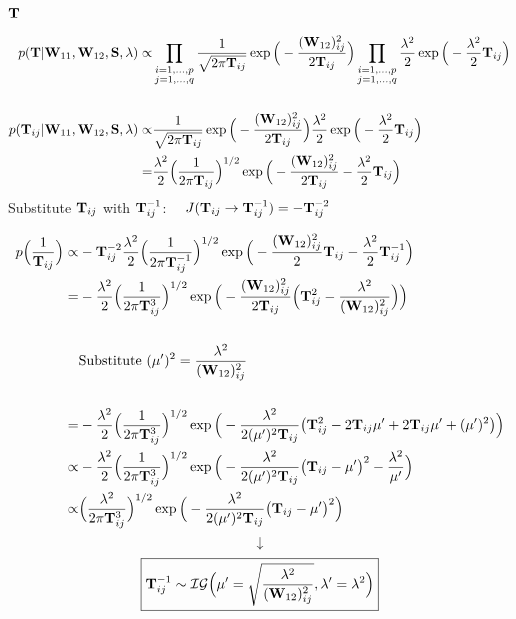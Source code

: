 \subsubsection{$\mathbf{T}$}
\begin{align*}
p(\mathbf{T}| \mathbf{W}_{11}, \mathbf{W}_{12}, \mathbf{S}, \lambda) \propto& 
\prod_{{\substack{i=1,\dots,p\\j=1,\dots,q}} }   \frac{1}{\sqrt{2\pi \mathbf{T}_{ij}}} \exp 
\Big( - \frac{(\mathbf{W}_{12})_{ij}^2}{2\mathbf{T}_{ij}} \Big) 
\prod_{{\substack{i=1,\dots,p\\j=1,\dots,q}} }   
\frac{\lambda^2}{2} 
\exp\Big( 
- \frac{\lambda^2}{2} \mathbf{T}_{ij} 
\Big)
\\
\\
p(\mathbf{T}_{ij}| \mathbf{W}_{11}, \mathbf{W}_{12}, \mathbf{S}, \lambda) \propto& 
\frac{1}{\sqrt{2\pi \mathbf{T}_{ij}}} \exp 
\Big( - \frac{(\mathbf{W}_{12})_{ij}^2}{2\mathbf{T}_{ij}} \Big)    
\frac{\lambda^2}{2} 
\exp\Big( 
- \frac{\lambda^2}{2} \mathbf{T}_{ij} 
\Big)
\\
=& \frac{\lambda^2}{2} \Big(\frac{1}{2\pi \mathbf{T}_{ij}}\Big)^{1/2} \exp \Big(-\frac{(\mathbf{W}_{12})_{ij}^2}{2\mathbf{T}_{ij}} - \frac{\lambda^2}{2} \mathbf{T}_{ij}\Big)
\end{align*}
Substitute $\mathbf{T}_{ij}$ with $\mathbf{T}_{ij}^{-1}$:
$
\quad
J(\mathbf{T}_{ij} \rightarrow \mathbf{T}_{ij}^{-1}) = -\mathbf{T}_{ij}^{-2}
$

\begin{align*}
p\Big(\frac{1}{\mathbf{T}_{ij}}\Big) \propto&
 -\mathbf{T}_{ij}^{-2} \frac{\lambda^2}{2}
\Big(
	\frac{1}{2\pi\mathbf{T}_{ij}^{-1}}
\Big)^{1/2} 
\exp \Big(
	- \frac{(\mathbf{W}_{12})_{ij}^2}{2}\mathbf{T}_{ij} - \frac{\lambda^2}{2}\mathbf{T}_{ij}^{-1}
\Big)
\\
=&
- \frac{\lambda^2}{2}
\Big(
	\frac{1}{2\pi\mathbf{T}_{ij}^{3}}
\Big)^{1/2} 
\exp \Big(
	- \frac{(\mathbf{W}_{12})_{ij}^2}{2\mathbf{T}_{ij}}
	\Big(
	\mathbf{T}_{ij}^2 - \frac{\lambda^2}{(\mathbf{W}_{12})_{ij}^{2}}
	\Big)
\Big)
\\
\\
&\text{Substitute }(\mu')^2 = \frac{\lambda^2}{(\mathbf{W}_{12})_{ij}^2}
\\
\\
=& 
- \frac{\lambda^2}{2}
\Big(
\frac{1}{2\pi\mathbf{T}_{ij}^{3}}
\Big)^{1/2} 
\exp \Big(
- \frac{\lambda^2}{2(\mu')^2\mathbf{T}_{ij}} \big(\mathbf{T}_{ij}^2 - 2 \mathbf{T}_{ij} \mu' + 2\mathbf{T}_{ij}\mu' + (\mu')^2 \big)
\Big)
\\
\propto& 
- \frac{\lambda^2}{2}
\Big(
\frac{1}{2\pi\mathbf{T}_{ij}^{3}}
\Big)^{1/2} 
\exp \Big(
- \frac{\lambda^2}{2(\mu')^2\mathbf{T}_{ij}} \big(\mathbf{T}_{ij} - \mu' \big)^2
-\frac{\lambda^2}{\mu'}
\Big)
\\
\propto&
\Big(
\frac{\lambda^2}{2\pi\mathbf{T}_{ij}^{3}}
\Big)^{1/2} 
\exp \Big(
- \frac{\lambda^2}{2(\mu')^2\mathbf{T}_{ij}} \big(\mathbf{T}_{ij} - \mu' \big)^2
\Big)
\end{align*}
$$\downarrow$$
\begin{equation}
\boxed{
	\mathbf{T}_{ij}^{-1} \sim \mathcal{IG}
	\Big(
	\mu' = \sqrt{
		\frac{\lambda^2}{(\mathbf{W}_{12})_{ij}^2}
	},
	\lambda' = \lambda^2
	\Big)
}
\end{equation}


